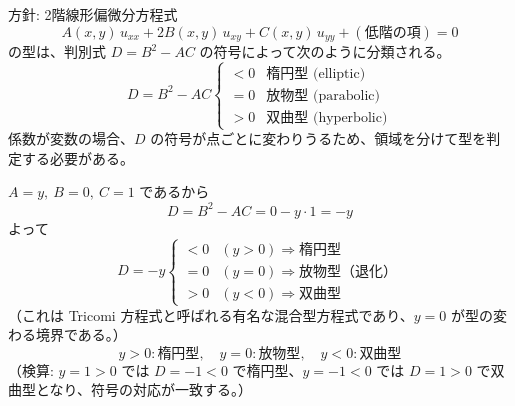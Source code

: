 
方針: 2階線形偏微分方程式
\[
A(x,y)\,u_{xx} + 2B(x,y)\,u_{xy} + C(x,y)\,u_{yy} + (\text{低階の項}) = 0
\]
の型は、判別式 $D = B^{2} - AC$ の符号によって次のように分類される。
\[
D = B^{2}-AC
\begin{cases}
< 0 & \text{楕円型 (elliptic)}\\
= 0 & \text{放物型 (parabolic)}\\
> 0 & \text{双曲型 (hyperbolic)}
\end{cases}
\]
係数が変数の場合、$D$ の符号が点ごとに変わりうるため、領域を分けて型を判定する必要がある。

$A=y,\ B=0,\ C=1$ であるから
\[
D = B^{2}-AC = 0 - y\cdot 1 = -y
\]
よって
\[
D = -y
\begin{cases}
<0 & (y>0) \Rightarrow \text{楕円型}\\
=0 & (y=0) \Rightarrow \text{放物型（退化）}\\
>0 & (y<0) \Rightarrow \text{双曲型}
\end{cases}
\]
（これは Tricomi 方程式と呼ばれる有名な混合型方程式であり、$y=0$ が型の変わる境界である。）
\[
\boxed{\; y>0:\text{楕円型},\quad y=0:\text{放物型},\quad y<0:\text{双曲型}\;}
\]
（検算: $y=1>0$ では $D=-1<0$ で楕円型、$y=-1<0$ では $D=1>0$ で双曲型となり、符号の対応が一致する。）
